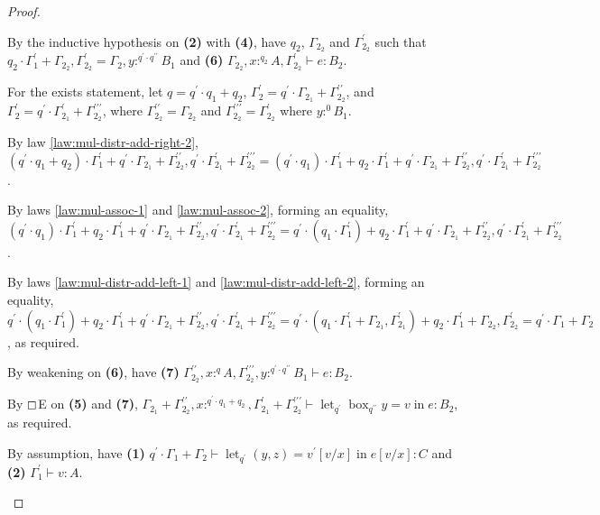 \documentclass[acmsmall,screen,nonacm]{acmart}
\DeclareMathOperator{\llet}{\text{let}}
\DeclareMathOperator{\lin}{\text{in}}
\DeclareMathOperator{\bbox}{\text{box}}
\newcommand{\tee}{\vdash}
\begin{document}
\begin{proof}
\begin{description}
    By the inductive hypothesis on \textbf{(2)} with \textbf{(4)}, have $q_2$, $\Gamma_{2_2}$ and $\Gamma_{2_2}^\prime$ such that $q_2 \cdot \Gamma_1^\prime + \Gamma_{2_2}, \Gamma_{2_2}^\prime = \Gamma_2, y :^{q^\prime \cdot q^{\prime\prime}} B_1$ and \textbf{(6)} $\Gamma_{2_2}, x :^{q_2} A, \Gamma_{2_2}^\prime \tee e : B_2$.

    For the exists statement, let $q = q^\prime \cdot q_1 + q_2$, $\Gamma_2^\prime = q^\prime \cdot \Gamma_{2_1} + \Gamma_{2_2}^{\prime\prime}$, and $\Gamma_2^\prime = q^\prime \cdot \Gamma_{2_1}^\prime + \Gamma_{2_2}^{\prime\prime\prime}$, where $\Gamma_{2_2}^{\prime\prime} = \Gamma_{2_2}$ and $\Gamma_{2_2}^{\prime\prime\prime} = \Gamma_{2_2}^\prime$ where $y :^0 B_1$.

    By law \ref{law:mul-distr-add-right-2}, $(q^\prime \cdot q_1 + q_2) \cdot \Gamma_1^\prime + q^\prime \cdot \Gamma_{2_1} + \Gamma_{2_2}^{\prime\prime}, q^\prime \cdot \Gamma_{2_1}^\prime + \Gamma_{2_2}^{\prime\prime\prime} = (q^\prime \cdot q_1) \cdot \Gamma_1^\prime + q_2 \cdot \Gamma_1^\prime + q^\prime \cdot \Gamma_{2_1} + \Gamma_{2_2}^{\prime\prime}, q^\prime \cdot \Gamma_{2_1}^\prime + \Gamma_{2_2}^{\prime\prime\prime}$.
    
    By laws \ref{law:mul-assoc-1} and \ref{law:mul-assoc-2}, forming an equality, $(q^\prime \cdot q_1) \cdot \Gamma_1^\prime + q_2 \cdot \Gamma_1^\prime + q^\prime \cdot \Gamma_{2_1} + \Gamma_{2_2}^{\prime\prime}, q^\prime \cdot \Gamma_{2_1}^\prime + \Gamma_{2_2}^{\prime\prime\prime} = q^\prime \cdot (q_1 \cdot \Gamma_1^\prime) + q_2 \cdot \Gamma_1^\prime + q^\prime \cdot \Gamma_{2_1} + \Gamma_{2_2}^{\prime\prime}, q^\prime \cdot \Gamma_{2_1}^\prime + \Gamma_{2_2}^{\prime\prime\prime}$. 
    
    By laws \ref{law:mul-distr-add-left-1} and \ref{law:mul-distr-add-left-2}, forming an equality, $q^\prime \cdot (q_1 \cdot \Gamma_1^\prime) + q_2 \cdot \Gamma_1^\prime + q^\prime \cdot \Gamma_{2_1} + \Gamma_{2_2}^{\prime\prime}, q^\prime \cdot \Gamma_{2_1}^\prime + \Gamma_{2_2}^{\prime\prime\prime} = q^\prime \cdot (q_1 \cdot \Gamma_1^\prime + \Gamma_{2_1}, \Gamma_{2_1}^\prime) + q_2 \cdot \Gamma_1^\prime + \Gamma_{2_2}, \Gamma_{2_2}^\prime = q^\prime \cdot \Gamma_1 + \Gamma_2$, as required.
    
    By weakening on \textbf{(6)}, have \textbf{(7)} $\Gamma_{2_2}^{\prime\prime}, x :^q A, \Gamma_{2_2}^{\prime\prime\prime}, y :^{q^\prime \cdot q^{\prime\prime}} B_1 \tee e : B_2$.

    By $\boxempty$E on \textbf{(5)} and \textbf{(7)}, $\Gamma_{2_1} + \Gamma_{2_2}^{\prime\prime}, x :^{q^\prime \cdot q_1 + q_2}, \Gamma_{2_1}^\prime + \Gamma_{2_2}^{\prime\prime\prime} \tee \llet_{q^\prime} \bbox_{q^{\prime\prime}} y = v \lin e : B_2$, as required.
    \\
    \item[Case SPLIT.] 
    By assumption, have \textbf{(1)} $q^\prime \cdot \Gamma_1 + \Gamma_2 \tee \llet_{q^\prime} (y, z) = v^\prime[v/x] \lin e[v/x] : C$ and \textbf{(2)} $\Gamma_1^\prime \tee v : A$.
    

\end{description}
\end{proof}
\end{document}
